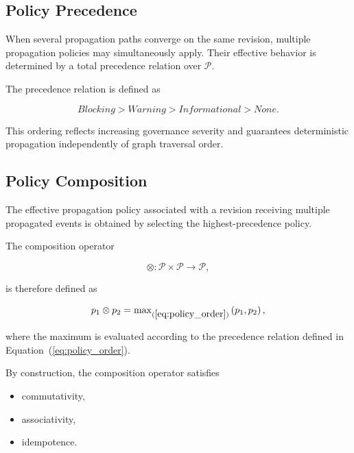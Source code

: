 \documentclass[10pt]{article}
\begin{document}
\subsection{Policy Precedence}

When several propagation paths converge on the same revision, multiple propagation policies may simultaneously apply. Their effective behavior is determined by a total precedence relation over $\mathcal{P}$.

The precedence relation is defined as

\begin{equation}
	\textit{Blocking}
	>
	\textit{Warning}
	>
	\textit{Informational}
	>
	\textit{None}.
	\label{eq:policy_order}
\end{equation}

This ordering reflects increasing governance severity and guarantees deterministic propagation independently of graph traversal order.

\subsection{Policy Composition}

The effective propagation policy associated with a revision receiving multiple propagated events is obtained by selecting the highest-precedence policy.

The composition operator

\begin{equation}
	\otimes :
	\mathcal{P}\times\mathcal{P}
	\rightarrow
	\mathcal{P},
	\label{eq:policy_composition}
\end{equation}

is therefore defined as

\begin{equation}
	p_1\otimes p_2
	=
	\max\nolimits_{(\ref{eq:policy_order})}
	\left(p_1,p_2\right),
	\label{eq:policy_max}
\end{equation}

where the maximum is evaluated according to the precedence relation defined in Equation~(\ref{eq:policy_order}).

By construction, the composition operator satisfies

\begin{itemize}
	\item commutativity,
	\item associativity,
	\item idempotence.
\end{itemize}
\end{document}

